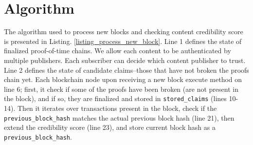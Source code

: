 \section{Algorithm}
The algorithm used to process new blocks and checking content credibility score is presented in Listing. \ref{listing_process_new_block}. Line 1 defines the state of finalized proof-of-time chains. We allow each content to be authenticated by multiple publishers. Each subscriber can decide which content publisher to trust. Line 2 defines the state of candidate claims–those that have not broken the proofs chain yet. Each blockchain node upon receiving a new block execute method on line 6; first, it check if some of the proofs have been broken (are not present in the block), and if so, they are finalized and stored in \verb|stored_claims| (lines 10-14). Then it iterates over transactions present in the block, check if the \verb|previous_block_hash| matches the actual previous block hash (line 21), then extend the credibility score (line 23), and store current block hash as a \verb|previous_block_hash|.







